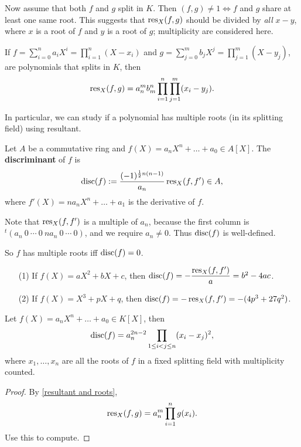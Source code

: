Now assume that both $f$ and $g$ split in $K$.
Then $(f, g)\ne 1\iff f$ and $g$ share at least one same root. This suggests that $\operatorname{res}_X(f, g)$ should be divided by \textit{all} $x - y$, where $x$ is a root of $f$ and $y$ is a root of $g$; multiplicity are considered here.
\begin{theorem}\label{resultant and roots}
    If $f = \sum_{i=0}^{n}a_iX^i = \prod_{i=1}^n(X-x_i)$ and $g = \sum_{j = 0}^m b_jX^j = \prod_{j = 1}^m (X - y_j)$,
    are polynomials that splits in $K$,
    then \[\operatorname{res}_X(f, g) = a_n^mb_m^n\prod_{i=1}^n\prod_{j=1}^m (x_i - y_j).\]
\end{theorem}

In particular, we can study if a polynomial has multiple roots (in its splitting field) using resultant.
\begin{definition}
    Let $A$ be a commutative ring and $f(X) = a_nX^n + \dots + a_0\in A[X]$.
    The \textbf{discriminant} of $f$ is\[\operatorname{disc}(f) := \frac{(-1)^{\frac{1}{2}n(n-1)}}{a_n}\operatorname{res}_X(f, f')\in A,\]
    where $f'(X) = na_nX^n + \dots + a_1$ is the derivative of $f$.

    Note that $\operatorname{res}_X(f, f')$ is a multiple of $a_n$,
    because the first column is $^t(a_n\ 0\ \cdots\ 0\ na_n\ 0\ \cdots\ 0)$, and we require $a_n\ne 0$. Thus $\operatorname{disc}(f)$ is well-defined.
\end{definition}
So $f$ has multiple roots iff $\operatorname{disc}(f) = 0$.
\begin{example}
    \begin{enumerate}
        \item [(1)] If $f(X) = aX^2 + bX + c$,
        then $\operatorname{disc}(f) = -\dfrac{\operatorname{res}_X(f, f')}{a} =b^2 - 4ac$.
        \item [(2)] If $f(X) = X^3 + pX + q$,
        then $\operatorname{disc}(f) = -\operatorname{res}_X(f, f') = -(4p^3 + 27q^2)$.
    \end{enumerate}
    \end{example}
    
\begin{proposition}\label{discriminant and roots}
    Let $f(X) = a_nX^n + \dots + a_0\in K[X]$,
    then \[\operatorname{disc}(f) = a_n^{2n-2}\prod_{1\le i < j\le n}(x_i - x_j)^2,\]
    where $x_1, \dots, x_n$ are all the roots of $f$ in a fixed splitting field with multiplicity counted.
\end{proposition}
\begin{proof}
    By \cref{resultant and roots},
    \[\operatorname{res}_X(f, g) = a_n^m\prod_{i = 1}^n g(x_i).\]
    Use this to compute.
\end{proof}
